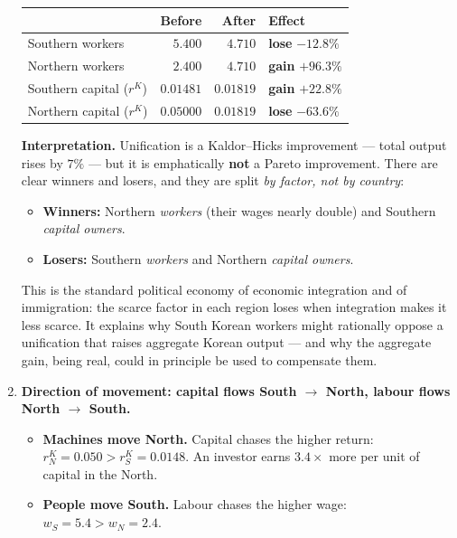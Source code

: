 \documentclass[12pt, letterpaper]{article}
\begin{document}
\begin{tcolorbox}[oddbox,title={Problem 4.3 \quad Korean Unification}]
\begin{enumerate}
\begin{center}
\begin{tabular}{lrrl}
\toprule
& \textbf{Before} & \textbf{After} & \textbf{Effect} \\
\midrule
Southern workers      & $5.400$ & $4.710$ & \textbf{lose} $-12.8\%$ \\
Northern workers      & $2.400$ & $4.710$ & \textbf{gain} $+96.3\%$ \\
Southern capital ($r^K$) & $0.01481$ & $0.01819$ & \textbf{gain} $+22.8\%$ \\
Northern capital ($r^K$) & $0.05000$ & $0.01819$ & \textbf{lose} $-63.6\%$ \\
\bottomrule
\end{tabular}
\end{center}

\textbf{Interpretation.} Unification is a Kaldor--Hicks improvement --- total output rises by
$7\%$ --- but it is emphatically \textbf{not} a Pareto improvement. There are clear winners
and losers, and they are split \emph{by factor, not by country}:
\begin{itemize}[leftmargin=1.3em,itemsep=2pt,topsep=2pt]
\item \textbf{Winners:} Northern \emph{workers} (their wages nearly double) and Southern
      \emph{capital owners}.
\item \textbf{Losers:} Southern \emph{workers} and Northern \emph{capital owners}.
\end{itemize}
This is the standard political economy of economic integration and of immigration: the
scarce factor in each region loses when integration makes it less scarce. It explains why
South Korean workers might rationally oppose a unification that raises aggregate Korean
output --- and why the aggregate gain, being real, could in principle be used to compensate
them.

\item \textbf{Direction of movement: capital flows South $\to$ North, labour flows North
$\to$ South.}

\begin{itemize}[leftmargin=1.3em,itemsep=3pt,topsep=2pt]
\item \textbf{Machines move North.} Capital chases the higher return: $r^K_N = 0.050 >
      r^K_S = 0.0148$. An investor earns $3.4\times$ more per unit of capital in the North.
\item \textbf{People move South.} Labour chases the higher wage: $w_S = 5.4 > w_N = 2.4$.
\end{itemize}


\end{enumerate}
\end{tcolorbox}
\end{document}
